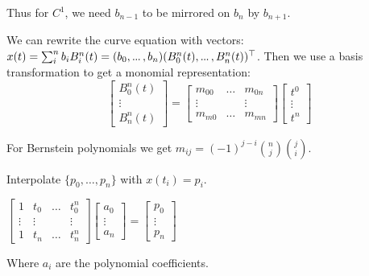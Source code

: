 \begin{theorem}
  Thus for \(C^1\), we need \(b_{n-1}\) to be mirrored on \(b_n\) by \(b_{n+1}\).
\end{theorem}

\pagebreak
\begin{definition}
  We can rewrite the curve equation with vectors:
  \(x(t) = \sum_i^n b_i B_i^n(t) = (b_0, \sdots, b_n)(B_0^n(t), \sdots, B_n^n(t))^\top\).
  Then we use a basis transformation to get a monomial representation:
  \[\begin{bmatrix}
    B_0^n(t) \\ \vdots \\ B_n^n(t)
  \end{bmatrix} = \begin{bmatrix}
    m_{00} & \ldots & m_{0n} \\ \vdots & & \vdots \\ m_{m0} & \ldots & m_{mn}
  \end{bmatrix} \begin{bmatrix}
    t^0 \\ \vdots \\ t^n
  \end{bmatrix}\]
\end{definition}

\begin{theorem}
  For Bernstein polynomials we get  \(m_{ij} = (-1)^{j-i}\binom{n}{j} \binom{j}{i}\).
\end{theorem}

\begin{definition}
  Interpolate \(\{p_0, \ldots, p_n\}\) with \(x(t_i) = p_i\).
  
  \begin{center}
    \(\begin{bmatrix}
      1 & t_0 & \ldots & t_0^n \\ \vdots & \vdots & & \vdots \\ 1 & t_n & \ldots & t_n^n
    \end{bmatrix} \begin{bmatrix}
      a_0 \\ \vdots \\ a_n
    \end{bmatrix} = \begin{bmatrix}
      p_0 \\ \vdots \\p_n
    \end{bmatrix}\)
  \end{center}

  Where \(a_i\) are the polynomial coefficients.
\end{definition}

